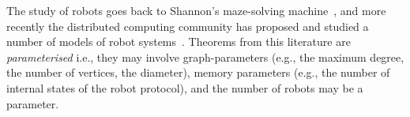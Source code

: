 \documentclass{aamas2015}
\newcommand{\sr}[1]{\footnote{{\color{red} Note. #1}}}
\begin{document}






The study of robots goes back to Shannon's maze-solving machine~\cite{Sh51}, and more recently the distributed computing community has proposed and studied a number of models of robot systems~\cite{Bender20021, KKR06, GR08, Das13, Diks200438,Cohen05graphexploration,FIPPP04}. Theorems from this literature are \emph{parameterised}
 i.e., they may involve {graph-parameters} (e.g., the maximum degree, the number of vertices, the diameter), {memory parameters} (e.g., the number of internal states of the robot protocol), and the {number of robots} may be a parameter.

 

\end{document}
